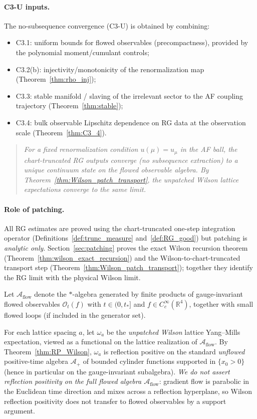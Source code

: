 \paragraph{C3-U inputs.}
The no-subsequence convergence (C3-U) is obtained by combining:
\begin{itemize}
\item C3.1: uniform bounds for flowed observables (precompactness), provided by the polynomial moment/cumulant controls;
\item C3.2(b): injectivity/monotonicity of the renormalization map (Theorem~\ref{thm:rho_inj});
\item C3.3: stable manifold / slaving of the irrelevant sector to the AF coupling trajectory (Theorem~\ref{thm:stable});
\item C3.4: bulk observable Lipschitz dependence on RG data at the observation scale (Theorem~\ref{thm:C3_4}).
\end{itemize}

\begin{quote}
\emph{For a fixed renormalization condition $u(\mu)=u_\mu$ in the AF ball, the chart-truncated RG outputs converge (no subsequence extraction) to a unique continuum state on the flowed observable algebra.  By Theorem~\ref{thm:Wilson_patch_transport}, the unpatched Wilson lattice expectations converge to the same limit.}
\end{quote}

\paragraph{Role of patching.}
All RG estimates are proved using the chart-truncated one-step integration operator (Definitions~\ref{def:trunc_measure} and~\ref{def:RG_good}) but patching is \emph{analytic only}.
Section~\ref{sec:patching} proves the exact Wilson recursion theorem (Theorem~\ref{thm:wilson_exact_recursion}) and the Wilson-to-chart-truncated transport step (Theorem~\ref{thm:Wilson_patch_transport}); together they identify the RG limit with the physical Wilson limit.

Let $\mathcal A_{\mathrm{flow}}$ denote the $\ast$-algebra generated by finite products of gauge-invariant flowed observables
$\mathcal O_{t}(f)$ with $t\in(0,t_\ast]$ and $f\in C_c^\infty(\mathbb R^4)$, together with small flowed loops (if included in the generator set).

For each lattice spacing $a$, let $\omega_a$ be the \emph{unpatched Wilson} lattice Yang--Mills expectation, viewed as a functional on the lattice realization of $\mathcal A_{\mathrm{flow}}$.
By Theorem~\ref{thm:RP_Wilson}, $\omega_a$ is reflection positive on the standard \emph{unflowed} positive-time algebra $\mathcal A_{+}$ of bounded cylinder functions supported in $\{x_0>0\}$ (hence in particular on the gauge-invariant subalgebra).
\emph{We do not assert reflection positivity on the full flowed algebra $\mathcal A_{\mathrm{flow}}$}: gradient flow is parabolic in the Euclidean time direction and mixes across a reflection hyperplane, so Wilson reflection positivity does not transfer to flowed observables by a support argument.

